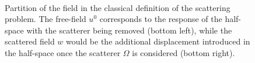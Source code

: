\documentclass[12pt,letterpaper]{article}
\begin{document}
\begin{figure}[H]
\centering
{}
\\
\caption{Partition of the field in the classical definition of the scattering problem. The free-field $u^0$ corresponds to the response of the half-space with the scatterer being removed (bottom left), while the scattered field $w$ would be the additional displacement introduced in the half-space once the scatterer $\Omega$ is considered (bottom right).}
\label{fig:class part}
\end{figure}
\end{document}

